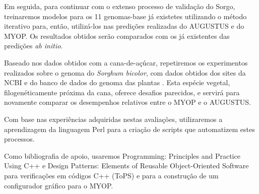 \documentclass[a4paper,12pt]{article}
\begin{document}
  Em seguida, para continuar com o extenso processo de validação do Sorgo, treinaremos
  modelos para os 11 genomas-base já existetes utilizando o método iterativo para,
  então, utilizá-los nas predições realizadas do AUGUSTUS e do MYOP. Os resultados 
  obtidos serão comparados com os já existentes das predições \textsl{ab initio}.
  
  Baseado nos dados obtidos com a cana-de-açúcar, repetiremos os experimentos realizados
  sobre o genoma do \textsl{Sorghum bicolor}, com dados obtidos dos sites da NCBI
  \citep{NCBI} e do banco de dados do genoma das plantas \citep{PlantGDB}. Esta 
  espécie vegetal, filogenéticamente próxima da cana, oferece desafios parecidos, 
  e servirá para novamente comparar os desempenhos relativos entre o MYOP e o AUGUSTUS.
  
  Com base nas experiências adquiridas nestas avaliações, utilizaremos a aprendizagem da 
  linguagem Perl \citep{BeginingPerl2001, CorePerl2001} para a criação de scripts que
  automatizem estes processos. 
  
  Como bibliografia de apoio, usaremos Programming: Principles and Practice Using C++
  \citep{ProgrammingC++1994} e Design Patterns: Elements of Reusable Object-Oriented 
  Software \citep{DesignPatterns1994} para verificações em códigos C++ (ToPS) e 
  para a construção de um configurador gráfico para o MYOP.
  
\newpage %
  \singlespacing   %
  
\end{document}
